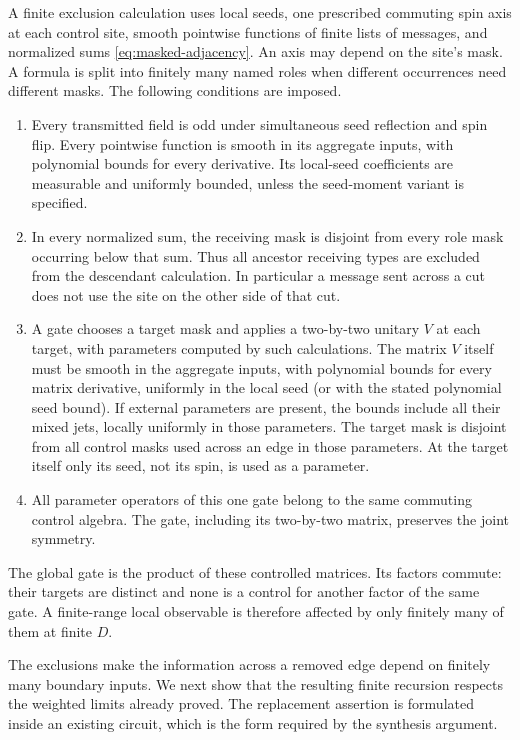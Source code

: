 \begin{definition}
\label{def:exclusion-gate}
A finite exclusion calculation uses local seeds, one prescribed
commuting spin axis at each control site, smooth pointwise
functions of finite lists of messages, and normalized sums
\eqref{eq:masked-adjacency}.  An axis may depend on the site's
mask.  A formula is split into finitely many named roles when
different occurrences need different masks.  The following
conditions are imposed.
\begin{enumerate}
\item Every transmitted field is odd under simultaneous seed
reflection and spin flip.  Every pointwise function is smooth
in its aggregate inputs, with polynomial bounds for every
derivative.  Its local-seed coefficients are measurable and
uniformly bounded, unless the seed-moment variant is specified.
\item In every normalized sum, the receiving mask is disjoint
from every role mask occurring below that sum.  Thus all
ancestor receiving types are excluded from the descendant
calculation.  In particular a message sent across a cut does
not use the site on the other side of that cut.
\item A gate chooses a target mask and applies a two-by-two
unitary $V$ at each target, with parameters computed by such
calculations.  The matrix $V$ itself must be smooth in the
aggregate inputs, with polynomial bounds for every matrix
derivative, uniformly in the local seed (or with the stated
polynomial seed bound).  If external parameters are present,
the bounds include all their mixed jets, locally uniformly
in those parameters.  The target mask is disjoint from all control
masks used across an edge in those parameters.  At the target
itself only its seed, not its spin, is used as a parameter.
\item All parameter operators of this one gate belong to the
same commuting control algebra.  The gate, including its
two-by-two matrix, preserves the joint symmetry.
\end{enumerate}
The global gate is the product of these controlled matrices.
Its factors commute: their targets are distinct and none is a
control for another factor of the same gate.  A finite-range
local observable is therefore affected by only finitely many
of them at finite $D$.
\end{definition}

The exclusions make the information across a removed edge depend on
finitely many boundary inputs.  We next show that the resulting
finite recursion respects the weighted limits already proved.  The
replacement assertion is formulated inside an existing circuit,
which is the form required by the synthesis argument.


